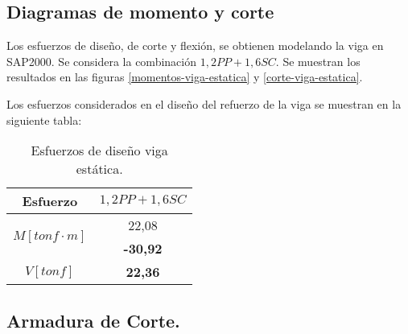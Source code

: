         
        
    \subsection{Diagramas de momento y corte}
        
        Los esfuerzos de diseño, de corte y flexión, se obtienen modelando la viga en SAP2000. Se considera la combinación $1,2PP+1,6SC$.  Se muestran los resultados en las figuras \ref{momentos-viga-estatica} y \ref{corte-viga-estatica}.
        
        
        
        Los esfuerzos considerados en el diseño del refuerzo de la viga se muestran en la siguiente tabla:
        
        \begin{table}[H]
          \centering
          \caption{Esfuerzos de diseño viga estática.}
            \begin{tabular}{cc}
            \hline
            \textbf{Esfuerzo} & \boldmath{}\textbf{$1,2 PP+1,6 SC$}\unboldmath{} \bigstrut\\
            \hline
            \multirow{2}[1]{*}{$M [tonf \cdot m] $} & 22,08 \bigstrut[t]\\
                  & \textbf{-30,92} \\
                \hline
            $V [tonf]$ & \textbf{22,36} \bigstrut[b]\\
            \hline
            \end{tabular}%
          \label{esf-diseno-estatica}%
        \end{table}%
        
    \subsection{Armadura de Corte.}
    
